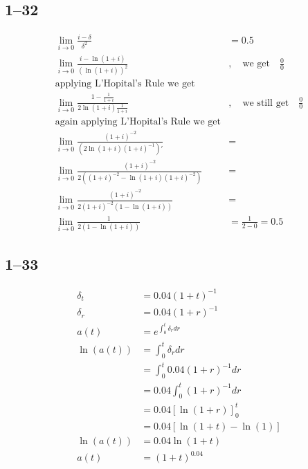 \documentclass[a4paper, 12pt, reqno]{amsart}
\numberwithin{equation}{section}
\begin{document}
\subsection*{1--32}

\begin{equation}\nonumber
    \begin{aligned}
        \lim_{i \rightarrow 0} \frac{i-\delta}{\delta^2} &= 0.5  \\
        \lim_{i \rightarrow 0} \frac{i-\ln{(1+i)}}{(\ln{(1+i)})^2}&, \quad
            \text{we get} \quad \frac{0}{0}             \\
        \text{applying L'Hopital's Rule we get}& \\
        \lim_{i \rightarrow 0}
            \frac{1-\frac{1}{1+i}}{2\ln{(1+i)}\frac{1}{1+i}}&, \quad
            \text{we still get} \quad \frac{0}{0} \\
        \text{again applying L'Hopital's Rule we get}& \\
        \lim_{i \rightarrow 0}
            \frac{(1+i)^{-2}}{\left(2\ln{(1+i)}(1+i)^{-1}\right)'} &= \\
        \lim_{i \rightarrow 0}\frac{(1+i)^{-2}}{2((1+i)^{-2} - 
            \ln{(1+i)}(1+i)^{-2})} &= \\
        \lim_{i \rightarrow 0}\frac{(1+i)^{-2}}{2(1+i)^{-2}(1 - 
            \ln{(1+i)})} &= \\
        \lim_{i \rightarrow 0}\frac{1}{2(1 - \ln{(1+i)})} &= \frac{1}{2-0}
            = 0.5 
    \end{aligned}
\end{equation}

\subsection*{1--33}

\begin{equation}\nonumber
    \begin{aligned}
        \delta_t &= 0.04(1+t)^{-1}                  \\
        \delta_r &= 0.04(1+r)^{-1}                  \\
        a(t) &= e^{\int_0^t \delta_r dr}            \\
        \ln{(a(t))} &= \int_0^t{\delta_r}{dr}            \\
        &= \int_0^t{0.04(1+r)^{-1}}{dr}            \\
        &= 0.04 \int_0^t{(1+r)^{-1}}{dr}            \\
        &= 0.04 \left[\ln{(1+r)}\right]^t_0            \\
        &= 0.04 \left[\ln{(1+t)} - \ln{(1)}\right]            \\
        \ln{(a(t))} &= 0.04 \ln{(1+t)}                  \\
        a(t) &= (1+t)^{0.04}
    \end{aligned}
\end{equation}
\end{document}
